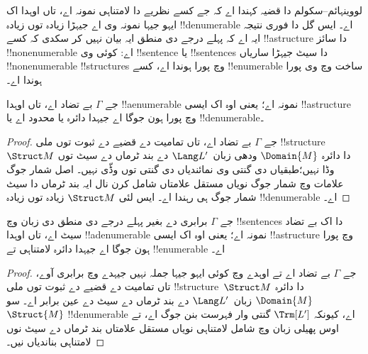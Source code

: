 \documentclass[../../../include/open-logic-section]{subfiles}
\begin{document}

لووینہائم--سکولم دا قضیہ کہندا اے کہ جے کسے نظریے
دا لامتناہی نمونہ اے، تاں اوہدا اک ایہو جیہا نمونہ
وی اے جیہڑا زیادہ توں زیادہ !!{denumerable} اے۔
ایس گل دا فوری نتیجہ ایہ اے کہ پہلے درجے دی منطق
ایہ بیان نہیں کر سکدی کہ کسے !!a{structure}
دا سائز !!{nonenumerable} اے: کوئی وی
!!{sentence} یا !!{sentence}s دا سیٹ جیہڑا
ساریاں !!{nonenumerable} !!{structure}s وچ پورا
ہوندا اے، کسے !!{enumerable} ساخت وچ وی پورا
ہوندا اے۔

\begin{thm}
جے $\Gamma$ بے تضاد اے، تاں اوہدا
!!a{enumerable} نمونہ اے؛ یعنی اوہ اک ایسی
!!a{structure} وچ پورا ہون جوگا اے جیہدا
دائرہ یا محدود اے یا !!{denumerable}۔
\end{thm}

\begin{proof}
جے $\Gamma$ بے تضاد اے، تاں تمامیت دے قضیے
دے ثبوت توں ملی !!{structure}~$\Struct M$
دا دائرہ $\Domain{M}$ ودھی زبان~$\Lang L'$
دے بند ٹرماں دے سیٹ توں وڈا نہیں؛طبقیاں دی گنتی وی نمائندیاں
دی گنتی توں وڈّی نہیں۔ اصل شمار جوگ علامات وچ شمار جوگ نویاں
مستقل علامتاں شامل کرن نال ایہ بند ٹرماں دا سیٹ شمار جوگ ہی
رہندا اے۔ ایس لئی
$\Struct M$ زیادہ توں زیادہ !!{denumerable}
اے۔
\end{proof}

\begin{thm}
جے $\Gamma$ برابری دے بغیر پہلے درجے دی
منطق دی زبان وچ !!{sentence}s دا اک بے تضاد
سیٹ اے، تاں اوہدا !!a{denumerable} نمونہ اے؛
یعنی اوہ اک ایسی !!a{structure} وچ پورا ہون
جوگا اے جیہدا دائرہ لامتناہی تے
!!{enumerable} اے۔
\end{thm}

\begin{proof}
جے $\Gamma$ بے تضاد اے تے اوہدے وچ کوئی
ایہو جیہا جملہ نہیں جیہدے وچ برابری آوے،
تاں تمامیت دے قضیے دے ثبوت توں ملی
!!{structure}~$\Struct M$ دا دائرہ
$\Domain{M}$ زبان~$\Lang L'$ دے بند
ٹرماں دے سیٹ دے عین برابر اے۔ سو
$\Struct{M}$ !!{denumerable} اے، کیونکہ
$\Trm[L']$ گنتی وار فہرست بنن جوگ اے،
تے اوس پھیلی زبان وچ شامل لامتناہی نویاں مستقل
علامتاں بند ٹرماں دے سیٹ نوں لامتناہی
بناندیاں نیں۔
\end{proof}
\end{document}
